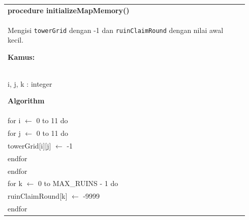 \documentclass{article}
\newenvironment{pseudobox}
{
\centering
\begin{longtable}{|p{0.94\linewidth}|}
\hline
}
{
\\ \hline
\end{longtable}
\vspace{0.05cm}
}
\begin{document}
\begin{pseudobox}
\textbf{procedure initializeMapMemory()} \\
{ Mengisi \texttt{towerGrid} dengan -1 dan \texttt{ruinClaimRound} dengan nilai awal kecil. }

\textbf{Kamus:} \\
\hspace*{1em} i, j, k : integer

\textbf{Algorithm} \\
\hspace*{1em} for i $\leftarrow$ 0 to 11 do \\
\hspace*{2em} for j $\leftarrow$ 0 to 11 do \\
\hspace*{3em} towerGrid[i][j] $\leftarrow$ -1 \\
\hspace*{2em} endfor \\
\hspace*{1em} endfor \\

\hspace*{1em} for k $\leftarrow$ 0 to MAX\_RUINS - 1 do \\
\hspace*{2em} ruinClaimRound[k] $\leftarrow$ -9999 \\
\hspace*{1em} endfor
\end{pseudobox}
\end{document}
